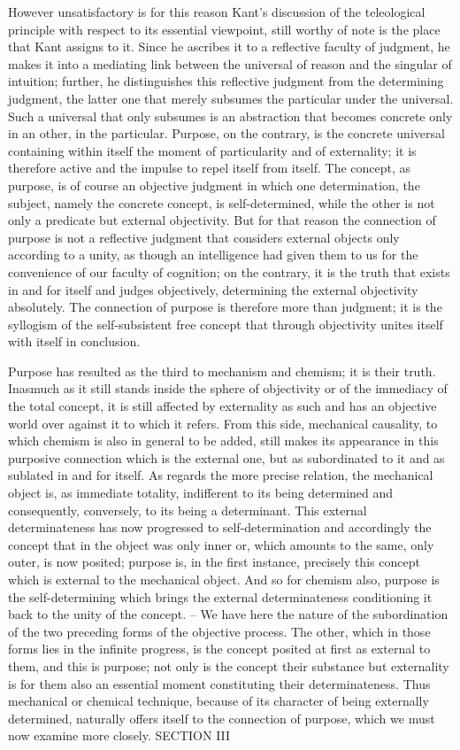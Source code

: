 However unsatisfactory is for this reason Kant's discussion
of the teleological principle with respect to its essential viewpoint,
still worthy of note is the place that Kant assigns to it.
Since he ascribes it to a reflective faculty of judgment,
he makes it into a mediating link between
the universal of reason and the singular of intuition;
further, he distinguishes this reflective judgment
from the determining judgment, the latter one that
merely subsumes the particular under the universal.
Such a universal that only subsumes is an abstraction
that becomes concrete only in an other, in the particular.
Purpose, on the contrary, is the concrete universal containing within itself
the moment of particularity and of externality;
it is therefore active and
the impulse to repel itself from itself.
The concept, as purpose, is of course
an objective judgment in which one determination,
the subject, namely the concrete concept, is self-determined,
while the other is not only a predicate but external objectivity.
But for that reason the connection of purpose is not
a reflective judgment that considers external objects
only according to a unity,
as though an intelligence had given them to us
for the convenience of our faculty of cognition;
on the contrary, it is the truth that exists in
and for itself and judges objectively,
determining the external objectivity absolutely.
The connection of purpose is therefore more than judgment;
it is the syllogism of the self-subsistent free concept
that through objectivity unites itself with itself in conclusion.

Purpose has resulted as the third to mechanism and chemism; it is their
truth.
Inasmuch as it still stands inside the sphere of objectivity or of the
immediacy of the total concept,
 it is still affected by externality as such and
has an objective world over against it to which it refers.
From this side,
mechanical causality,
to which chemism is also in general to be added,
still makes its appearance in this purposive connection which is the external
one,
but as subordinated to it and as sublated in and for itself. As regards
the more precise relation,
 the mechanical object is, as immediate totality,
indifferent to its being determined and consequently, conversely,
to its
being a determinant.
This external determinateness has now progressed to
self-determination and accordingly the concept that in the object was only
inner or, which amounts to the same, only outer, is now posited;
 purpose
is, in the first instance, precisely this concept which is external to the
mechanical object.
And so for chemism also, purpose is the self-determining
which brings the external determinateness conditioning it back to the unity
of the concept. –
We have here the nature of the subordination of the two
preceding forms of the objective process.
 The other, which in those forms
lies in the infinite progress, is the concept posited at first as external to them,
and this is purpose; not only is the concept their substance but externality
is for them also an essential moment constituting their determinateness.
Thus mechanical or chemical technique,
because of its character of being
externally determined,
naturally offers itself to the connection of purpose,
which we must now examine more closely.
SECTION III

